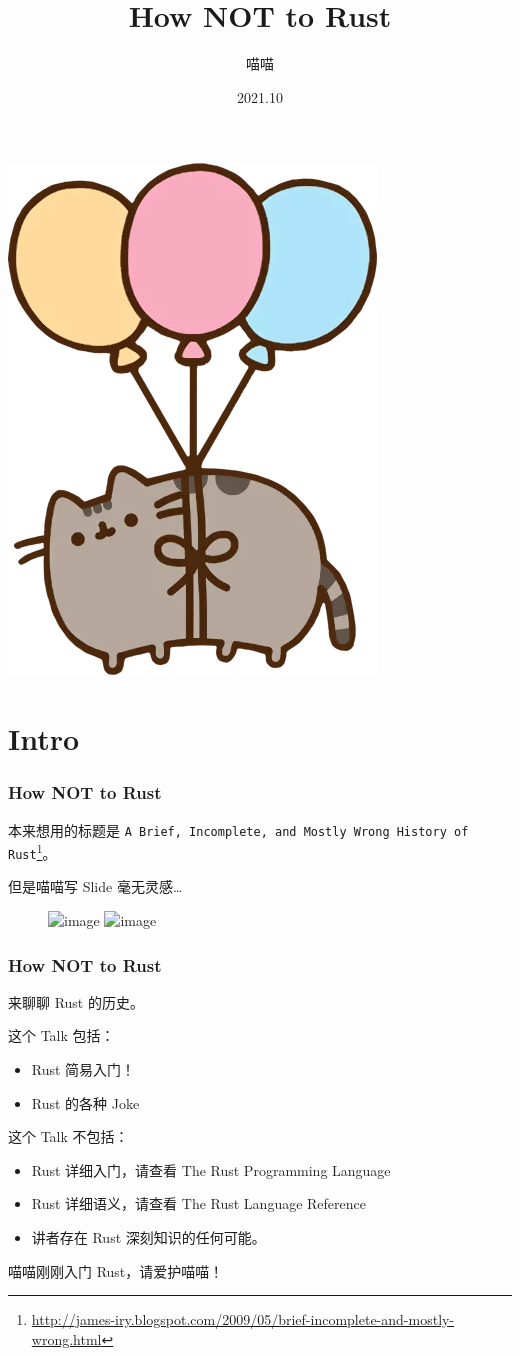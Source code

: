 \documentclass[UTF-8]{ctexbeamer}
\title{How NOT to Rust}
\author{喵喵}
\date{2021.10}
\begin{document}
\begin{frame}
  \titlepage
  \begin{center}
    \includegraphics[width=.1\textwidth]{assets/float.png}
  \end{center}
\end{frame}

\section{Intro}

\begin{frame}
  \frametitle{How NOT to Rust}

  本来想用的标题是 \texttt{A Brief, Incomplete, and Mostly Wrong History of Rust}\footnote{\url{http://james-iry.blogspot.com/2009/05/brief-incomplete-and-mostly-wrong.html}}。

  \pause
  \vspace{1em}

  但是喵喵写 Slide 毫无灵感\dots

  \begin{figure}
    \includegraphics<2>[width=0.25\textwidth]{assets/avatar.jpg}
    \includegraphics<3>[width=0.5\textwidth]{assets/avatarWD40.png}
  \end{figure}
\end{frame}

\begin{frame}
  \frametitle{How NOT to Rust}

  来聊聊 Rust 的历史。

  \pause

  这个 Talk 包括：
  \begin{itemize}
    \item Rust 简易入门！
    \item Rust 的各种 Joke
  \end{itemize}

  这个 Talk 不包括：
  \begin{itemize}
    \item Rust 详细入门，请查看 The Rust Programming Language
    \item Rust 详细语义，请查看 The Rust Language Reference
    \item 讲者存在 Rust 深刻知识的任何可能。
  \end{itemize}

  \pause

  喵喵刚刚入门 Rust，请爱护喵喵！
\end{frame}
\end{document}
